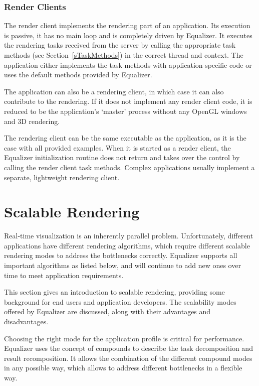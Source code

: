 \documentclass[10pt,a4]{scrartcl}
\newcommand{\sref}[1]{Section~\ref{#1}}
\begin{document}
\subsubsection{Render Clients}

The render client implements the rendering part of an application. Its
execution is passive, it has no main loop and is completely driven by
Equalizer. It executes the rendering tasks received from the server by
calling the appropriate task methods (see \sref{sTaskMethods}) in the
correct thread and context. The application either implements the task
methods with application-specific code or uses the default methods
provided by Equalizer.

The application can also be a rendering client, in which case it can
also contribute to the rendering. If it does not implement any render
client code, it is reduced to be the application's `master' process
without any OpenGL windows and 3D rendering.

The rendering client can be the same executable as the application, as
it is the case with all provided examples. When it is started as a
render client, the Equalizer initialization routine does not return and
takes over the control by calling the render client task
methods. Complex applications usually implement a separate, lightweight
rendering client.


\section{Scalable Rendering}

Real-time visualization is an inherently parallel
problem. Unfortunately, different applications have different rendering
algorithms, which require different scalable rendering modes to address
the bottlenecks correctly. Equalizer supports all important algorithms as
listed below, and will continue to add new ones over time to meet
application requirements.

This section gives an introduction to scalable rendering, providing some
background for end users and application developers. The scalability
modes offered by Equalizer are discussed, along with their advantages
and disadvantages.

Choosing the right mode for the application profile is critical for
performance. Equalizer uses the concept of compounds to describe the
task decomposition and result recomposition. It allows the combination
of the different compound modes in any possible way, which allows to
address different bottlenecks in a flexible way.
\end{document}
